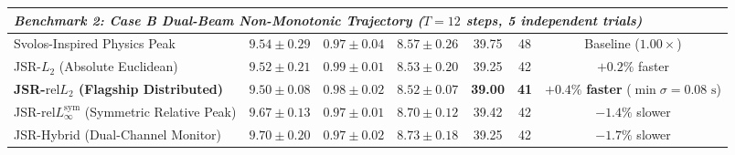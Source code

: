 \documentclass[preprint,12pt,3p]{elsarticle}
\begin{document}
\begin{table}[htbp]
{\begin{tabular}{lcccccc}
\midrule
\multicolumn{7}{l}{\textit{Benchmark 2: Case B Dual-Beam Non-Monotonic Trajectory ($T=12$ steps, 5 independent trials)}} \\
\midrule
Svolos-Inspired Physics Peak & $9.54 \pm 0.29$ & $0.97 \pm 0.04$ & $8.57 \pm 0.26$ & 39.75 & 48 & Baseline ($1.00\times$) \\
JSR-$L_2$ (Absolute Euclidean) & $9.52 \pm 0.21$ & $0.99 \pm 0.01$ & $8.53 \pm 0.20$ & 39.25 & 42 & $+0.2\%$ faster \\
\textbf{JSR-$\text{rel}L_2$ (Flagship Distributed)} & $\mathbf{9.50 \pm 0.08}$ & $\mathbf{0.98 \pm 0.02}$ & $\mathbf{8.52 \pm 0.07}$ & \textbf{39.00} & \textbf{41} & $\mathbf{+0.4\%}$ \textbf{faster} ($\min \sigma = 0.08\text{ s}$) \\
JSR-$\text{rel}L_\infty^{\text{sym}}$ (Symmetric Relative Peak) & $9.67 \pm 0.13$ & $0.97 \pm 0.01$ & $8.70 \pm 0.12$ & 39.42 & 42 & $-1.4\%$ slower \\
JSR-Hybrid (Dual-Channel Monitor) & $9.70 \pm 0.20$ & $0.97 \pm 0.02$ & $8.73 \pm 0.18$ & 39.25 & 42 & $-1.7\%$ slower \\
\bottomrule
\end{tabular}%
}
\end{table}
\end{document}
